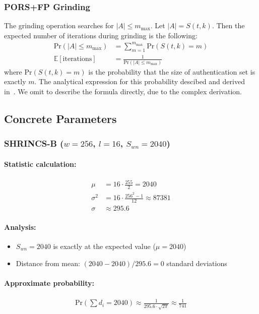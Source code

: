 \subsubsection{PORS+FP Grinding}
The grinding operation searches for $|A| \le m_{\max}$. Let $|A| = S(t,k)$. Then the expected number of iterations during grinding is the following:
\begin{align}
    \text{Pr}(|A| \le m_{\max}) &= \sum_{m=1}^{m_{\max}} \text{Pr}(S(t,k) = m)\\
    \mathbb{E}[\text{iterations}] &= \frac{1}{\text{Pr}\left(|A| \le m_{\max}\right)}
\end{align}
where $\text{Pr}(S(t,k) = m)$ is the probability that the size of authentication set is exactly $m$. 
The analytical expression for this probability descibed and derived in~\cite{pors_fp2025}.
We omit to describe the formula directly, due to the complex derivation.

\subsection{Concrete Parameters}

\subsubsection{SHRINCS-B ($w=256$, $l=16$, $S_{wn}=2040$)}
\paragraph{Statistic calculation:}
\begin{align}
    \mu &= 16 \cdot \frac{255}{2} = 2040 \\
    \sigma^2 &= 16 \cdot \frac{256^2-1}{12} \approx 87381 \\
    \sigma &\approx 295.6
\end{align}

\paragraph{Analysis:}
\begin{itemize}
    \item $S_{wn} = 2040$ is exactly at the expected value ($\mu = 2040$)
    \item Distance from mean: $(2040 - 2040)/295.6 = 0$ standard deviations
\end{itemize}

\paragraph{Approximate probability:}
\begin{align}
    \text{Pr}\left(\sum d_i = 2040\right) \approx \frac{1}{295.6 \cdot \sqrt{2\pi}} \approx \frac{1}{741}
\end{align}


